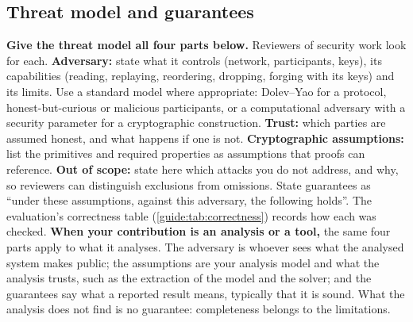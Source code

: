 \subsection{Threat model and guarantees}\label{guide:chapters:threat-model}
\textbf{Give the threat model all four parts below.} Reviewers of security work look for each.
\textbf{Adversary:} state what it controls (network, participants, keys), its capabilities (reading, replaying, reordering, dropping, forging with its keys) and its limits. Use a standard model where appropriate: Dolev--Yao for a protocol, honest-but-curious or malicious participants, or a computational adversary with a security parameter for a cryptographic construction.
\textbf{Trust:} which parties are assumed honest, and what happens if one is not.
\textbf{Cryptographic assumptions:} list the primitives and required properties as assumptions that proofs can reference.
\textbf{Out of scope:} state here which attacks you do not address, and why, so reviewers can distinguish exclusions from omissions.
State guarantees as \enquote{under these assumptions, against this adversary, the following holds}. The evaluation's correctness table (\cref{guide:tab:correctness}) records how each was checked.
\textbf{When your contribution is an analysis or a tool,} the same four parts apply to what it analyses. The adversary is whoever sees what the analysed system makes public; the assumptions are your analysis model and what the analysis trusts, such as the extraction of the model and the solver; and the guarantees say what a reported result means, typically that it is sound. What the analysis does not find is no guarantee: completeness belongs to the limitations.

